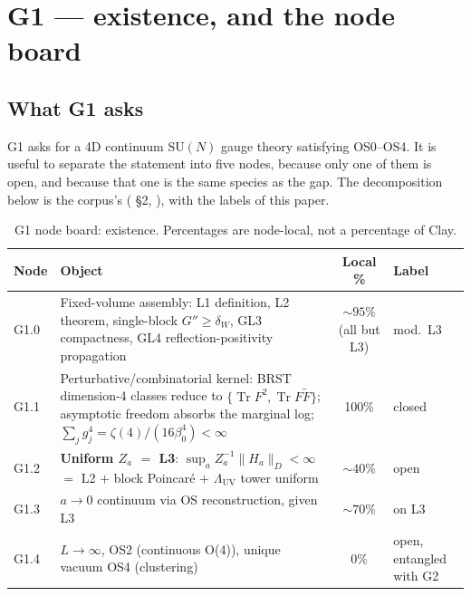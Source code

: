 \section{G1 --- existence, and the node board}

\figpipeline

\figlattice
\label{ch:existence}

\subsection{What G1 asks}

G1 asks for a 4D continuum $\mathrm{SU}(N)$ gauge theory satisfying OS0--OS4. It is useful to
separate the statement into five nodes, because only one of them is open, and because that one is
the same species as the gap. The decomposition below is the corpus's
( \S2, ), with the
labels of this paper.

\begin{table}[t]
\centering
\footnotesize
\begin{tabularx}{\textwidth}{@{}l>{\raggedright\arraybackslash}Xc>{\raggedright\arraybackslash}p{3.2cm}@{}}
\toprule
\textbf{Node} & \textbf{Object} & \textbf{Local \%} & \textbf{Label}\\
\midrule
G1.0 & Fixed-volume assembly: L1 definition, L2 theorem, single-block $G''\ge\delta_W$,
  GL3 compactness, GL4 reflection-positivity propagation & $\sim95\%$ (all but L3) & \LT{} mod.\ L3\\
G1.1 & Perturbative/combinatorial kernel: BRST dimension-4 classes reduce to
  $\{\operatorname{Tr}F^2,\operatorname{Tr}F\tilde F\}$; asymptotic freedom absorbs the marginal
  log; $\sum_j g_j^4=\zeta(4)/(16\beta_0^4)<\infty$ & 100\% & \LT{} closed\\
G1.2 & \textbf{Uniform $Z_a$ $=$ L3}: $\sup_a Z_a^{-1}\|H_a\|_D<\infty$ $=$ L2 $+$ block
  Poincar\'e $+$ $\Lambda_{\mathrm{UV}}$ tower uniform & $\sim40\%$ & \LM{} open\\
G1.3 & $a\to0$ continuum via OS reconstruction, given L3 & $\sim70\%$ & \LC{} on L3\\
G1.4 & $L\to\infty$, OS2 (continuous O(4)), unique vacuum OS4 (clustering) & 0\% &
  \LM{} open, entangled with G2\\
\bottomrule
\end{tabularx}
\caption{G1 node board: existence. Percentages are node-local, not a percentage of Clay.}
\label{tab:g1}
\end{table}

